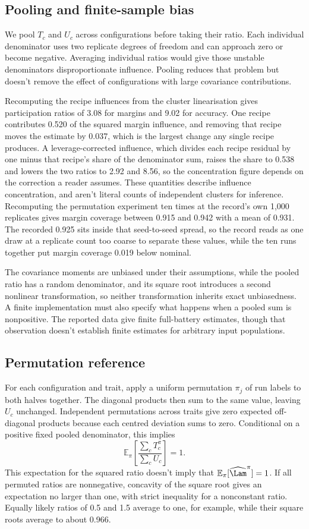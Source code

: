 \subsection{Pooling and finite-sample bias}
We pool $T_c$ and $U_c$ across configurations before taking their ratio. Each individual denominator uses two replicate degrees of freedom and can approach zero or become negative. Averaging individual ratios would give those unstable denominators disproportionate influence. Pooling reduces that problem but doesn't remove the effect of configurations with large covariance contributions.

Recomputing the recipe influences from the cluster linearisation gives participation ratios of 3.08 for margins and 9.02 for accuracy. One recipe contributes 0.520 of the squared margin influence, and removing that recipe moves the estimate by 0.037, which is the largest change any single recipe produces. A leverage-corrected influence, which divides each recipe residual by one minus that recipe's share of the denominator sum, raises the share to 0.538 and lowers the two ratios to 2.92 and 8.56, so the concentration figure depends on the correction a reader assumes. These quantities describe influence concentration, and aren't literal counts of independent clusters for inference. Recomputing the permutation experiment ten times at the record's own 1,000 replicates gives margin coverage between 0.915 and 0.942 with a mean of 0.931. The recorded 0.925 sits inside that seed-to-seed spread, so the record reads as one draw at a replicate count too coarse to separate these values, while the ten runs together put margin coverage 0.019 below nominal.

The covariance moments are unbiased under their assumptions, while the pooled ratio has a random denominator, and its square root introduces a second nonlinear transformation, so neither transformation inherits exact unbiasedness. A finite implementation must also specify what happens when a pooled sum is nonpositive. The reported data give finite full-battery estimates, though that observation doesn't establish finite estimates for arbitrary input populations.

\subsection{Permutation reference}
For each configuration and trait, apply a uniform permutation $\pi_j$ of run labels to both halves together. The diagonal products then sum to the same value, leaving $U_c$ unchanged. Independent permutations across traits give zero expected off-diagonal products because each centred deviation sums to zero. Conditional on a positive fixed pooled denominator, this implies
\begin{equation}
\mathbb E_\pi\left[\frac{\sum_cT_c^\pi}{\sum_cU_c}\right]=1.
\end{equation}
This expectation for the squared ratio doesn't imply that $\mathbb E_\pi[\widehat\Lam^\pi]=1$. If all permuted ratios are nonnegative, concavity of the square root gives an expectation no larger than one, with strict inequality for a nonconstant ratio. Equally likely ratios of 0.5 and 1.5 average to one, for example, while their square roots average to about 0.966.


